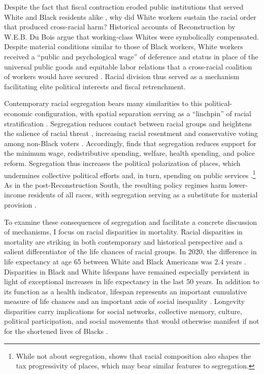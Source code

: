 \documentclass[11pt]{article}
\begin{document}
Despite the fact that fiscal contraction eroded public institutions that served White and Black residents alike \citep{margo_race_1990}, why did White workers sustain the racial order that produced cross-racial harm? Historical accounts of Reconstruction by W.E.B. Du Bois argue that working-class Whites were symbolically compensated. Despite material conditions similar to those of Black workers, White workers received a ``public and psychological wage'' of deference and status in place of the universal public goods and equitable labor relations that a cross-racial coalition of workers would have secured \citep[pp.~700--701]{dubois_black_1935}. Racial division thus served as a mechanism facilitating elite political interests and fiscal retrenchment.

Contemporary racial segregation bears many similarities to this political-economic configuration, with spatial separation serving as a ``linchpin'' of racial stratification \citep{massey_residential_2018}. Segregation reduces contact between racial groups and heightens the salience of racial threat \citep{blumer_race_1958,blalock_1967}, increasing racial resentment and conservative voting among non-Black voters \citep{ananat_segregation_2009}. Accordingly, \citet{chyn_effects_2026} finds that segregation reduces support for the minimum wage, redistributive spending, welfare, health spending, and police reform. Segregation thus increases the political polarization of places, which undermines collective political efforts and, in turn, spending on public services \citep{trounstine_segregation_2016}.\footnote{While not about segregation, \citet{obrien_redistribution_2017} shows that racial composition also shapes the tax progressivity of places, which may bear similar features to segregation.} As in the post-Reconstruction South, the resulting policy regimes harm lower-income residents of all races, with segregation serving as a substitute for material provision \citep{metzl_dying_2019}. 

To examine these consequences of segregation and facilitate a concrete discussion of mechanisms, I focus on racial disparities in mortality. Racial disparities in mortality are striking in both contemporary and historical perspective and a salient differentiator of the life chances of racial groups. In 2020, the difference in life expectancy at age 65 between White and Black Americans was $2.4$ years \citep{arias_united_2022}. Disparities in Black and White lifespans have remained especially persistent in light of exceptional increases in life expectancy in the last 50 years. In addition to its function as a health indicator, lifespan represents an important cumulative measure of life chances \citep{weber_economy_1922} and an important axis of social inequality \citep{wrigley-field_stolen_2024}. Longevity disparities carry implications for social networks, collective memory, culture, political participation, and social movements that would otherwise manifest if not for the shortened lives of Blacks \citep{wrigley-field_three_2025}.
\end{document}
